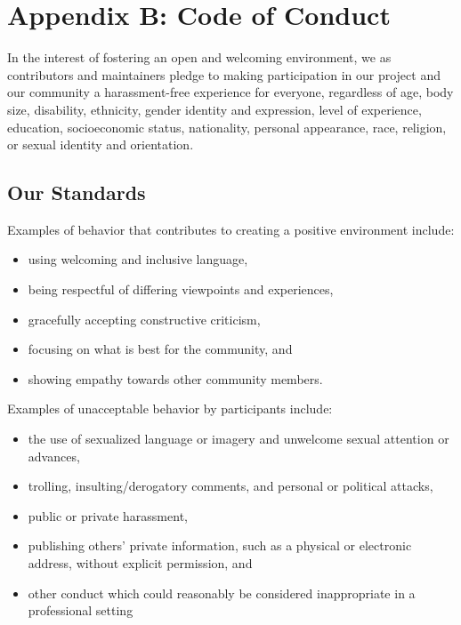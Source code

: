 \documentclass[krantzl]{krantz}
\begin{document}
\chapter{Appendix B: Code of Conduct}\label{conduct}


In the interest of fostering an open and welcoming environment, we as
contributors and maintainers pledge to making participation in our project and
our community a harassment-free experience for everyone, regardless of age, body
size, disability, ethnicity, gender identity and expression, level of
experience, education, socioeconomic status, nationality, personal appearance,
race, religion, or sexual identity and orientation.

\section*{Our Standards}


Examples of behavior that contributes to creating a positive environment
include:

\begin{itemize}

\item using welcoming and inclusive language,

\item being respectful of differing viewpoints and experiences,

\item gracefully accepting constructive criticism,

\item focusing on what is best for the community, and

\item showing empathy towards other community members.

\end{itemize}


Examples of unacceptable behavior by participants include:

\begin{itemize}

\item the use of sexualized language or imagery and unwelcome sexual
  attention or advances,

\item trolling, insulting/derogatory comments, and personal or political
  attacks,

\item public or private harassment,

\item publishing others' private information, such as a physical or
  electronic address, without explicit permission, and

\item other conduct which could reasonably be considered inappropriate in
  a professional setting

\end{itemize}
\end{document}
